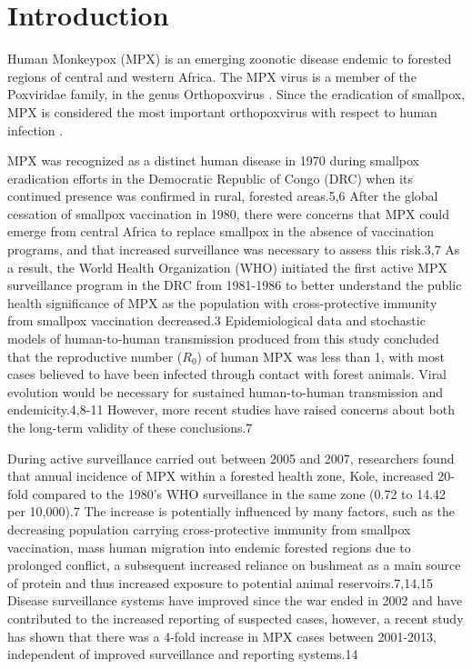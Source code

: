 \section{Introduction}
Human Monkeypox (MPX) is an emerging zoonotic disease endemic to forested regions of central and western Africa. The MPX virus is a member of the Poxviridae family, in the genus Orthopoxvirus \cite{Kulesh2004}. Since the eradication of smallpox, MPX is considered the most important orthopoxvirus with respect to human infection \cite{Khodakevich1988, WorldHealthOraganization1980, Fine1988}.

MPX was recognized as a distinct human disease in 1970 during smallpox eradication efforts in the Democratic Republic of Congo (DRC) when its continued presence was confirmed in rural, forested areas.5,6 After the global cessation of smallpox vaccination in 1980, there were concerns that MPX could emerge from central Africa to replace smallpox in the absence of vaccination programs, and that increased surveillance was necessary to assess this risk.3,7 As a result, the World Health Organization (WHO) initiated the first active MPX surveillance program in the DRC from 1981-1986 to better understand the public health significance of MPX as the population with cross-protective immunity from smallpox vaccination decreased.3 Epidemiological data and stochastic models of human-to-human transmission produced from this study concluded that the reproductive number ($R_{0}$) of human MPX was less than 1, with most cases believed to have been infected through contact with forest animals. Viral evolution would be necessary for sustained human-to-human transmission and endemicity.4,8-11 However, more recent studies have raised concerns about both the long-term validity of these conclusions.7 

During active surveillance carried out between 2005 and 2007, researchers found that annual incidence of MPX within a forested health zone, Kole, increased 20-fold compared to the 1980’s WHO surveillance in the same zone (0.72 to 14.42 per 10,000).7 The increase is potentially influenced by many factors, such as the decreasing population carrying cross-protective immunity from smallpox vaccination, mass human migration into endemic forested regions due to prolonged conflict, a subsequent increased reliance on bushmeat as a main source of protein and thus increased exposure to potential animal reservoirs.7,14,15 Disease surveillance systems have improved since the war ended in 2002 and have contributed to the increased reporting of suspected cases, however, a recent study has shown that there was a 4-fold increase in MPX cases between 2001-2013, independent of improved surveillance and reporting systems.14 

